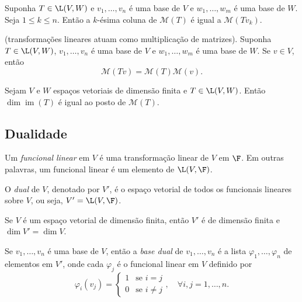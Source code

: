 \documentclass{article}
\DeclareMathOperator{\im}{im}
\begin{document}
\begin{cor}
    Suponha \(T \in \L(V, W)\) e \(v_1,\ldots,v_n\) é uma base de \(V\) e \(w_1,\ldots,w_m\) é uma base de \(W\). Seja \(1 \leq k \leq n\). Então a \(k\)-ésima coluna de \(\mathcal{M}(T)\) é igual a \(\mathcal{M}(Tv_k)\).
\end{cor}

\begin{prop} (transformações lineares atuam como multiplicação de matrizes).
    Suponha \(T \in \L(V, W)\), \(v_1,\ldots,v_n\) é uma base de \(V\) e \(w_1,\ldots,w_m\) é uma base de \(W\). Se \(v \in V\), então
    \[
        \mathcal{M}(Tv) = \mathcal{M}(T) \mathcal{M}(v).
    \]
\end{prop}

\begin{prop}
    Sejam \(V\) e \(W\) espaços vetoriais de dimensão finita e \(T \in \L(V, W)\). Então \(\dim \im(T)\) é igual ao posto de \(\mathcal{M}(T)\).
\end{prop}

\subsection{Dualidade}

\begin{defn}
    Um \emph{funcional linear} em \(V\) é uma transformação linear de \(V\) em \(\F\). Em outras palavras, um funcional linear é um elemento de \(\L(V, \F)\).
\end{defn}

\begin{defn}
    O \emph{dual} de \(V\), denotado por \(V'\), é o espaço vetorial de todos os funcionais lineares sobre \(V\), ou seja, \(V' = \L(V, \F)\).
\end{defn}

\begin{prop}
    Se \(V\) é um espaço vetorial de dimensão finita, então \(V'\) é de dimensão finita e \(\dim V' = \dim V\).
\end{prop}

\begin{defn}
    Se \(v_1, \ldots, v_n\) é uma base de \(V\), então a \emph{base dual} de \(v_1, \ldots, v_n\) é a lista \(\varphi_1, \ldots, \varphi_n\) de elementos em \(V'\), onde cada \(\varphi_j\) é o funcional linear em \(V\) definido por
    \[
        \varphi_i(v_j) = \begin{cases}
            1 & \text{se } i = j \\
            0 & \text{se } i \neq j
        \end{cases}, \quad \forall i,j = 1,\ldots,n.
    \]
\end{defn}
\end{document}
